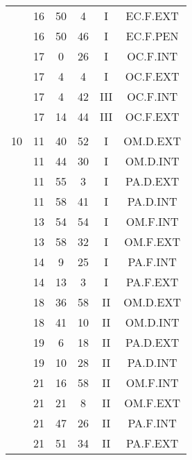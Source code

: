 \documentclass[12pt, a4paper]{article}
\begin{document}
\begin{multicols}{3}
{\begin{tabular}{c c c c c c}
	 	 	 	 & 16 & 50 & 4 & I & EC.F.EXT\\%
	 	 	 	 & 16 & 50 & 46 & I & EC.F.PEN\\%
	 	 	 	 & 17 & 0 & 26 & I & OC.F.INT\\%
	 	 	 	 & 17 & 4 & 4 & I & OC.F.EXT\\%
	 	 	 	 & 17 & 4 & 42 & III & OC.F.INT\\%
	 	 	 	 & 17 & 14 & 44 & III & OC.F.EXT\\%
	 	 	 	 & & & & & \\%
	 	 	 	10 & 11 & 40 & 52 & I & OM.D.EXT\\%
	 	 	 	 & 11 & 44 & 30 & I & OM.D.INT\\%
	 	 	 	 & 11 & 55 & 3 & I & PA.D.EXT\\%
	 	 	 	 & 11 & 58 & 41 & I & PA.D.INT\\%
	 	 	 	 & 13 & 54 & 54 & I & OM.F.INT\\%
	 	 	 	 & 13 & 58 & 32 & I & OM.F.EXT\\%
	 	 	 	 & 14 & 9 & 25 & I & PA.F.INT\\%
	 	 	 	 & 14 & 13 & 3 & I & PA.F.EXT\\%
	 	 	 	 & 18 & 36 & 58 & II & OM.D.EXT\\%
	 	 	 	 & 18 & 41 & 10 & II & OM.D.INT\\%
	 	 	 	 & 19 & 6 & 18 & II & PA.D.EXT\\%
	 	 	 	 & 19 & 10 & 28 & II & PA.D.INT\\%
	 	 	 	 & 21 & 16 & 58 & II & OM.F.INT\\%
	 	 	 	 & 21 & 21 & 8 & II & OM.F.EXT\\%
	 	 	 	 & 21 & 47 & 26 & II & PA.F.INT\\%
	 	 	 	 & 21 & 51 & 34 & II & PA.F.EXT\\%

\end{tabular}}
\end{multicols}
\end{document}
